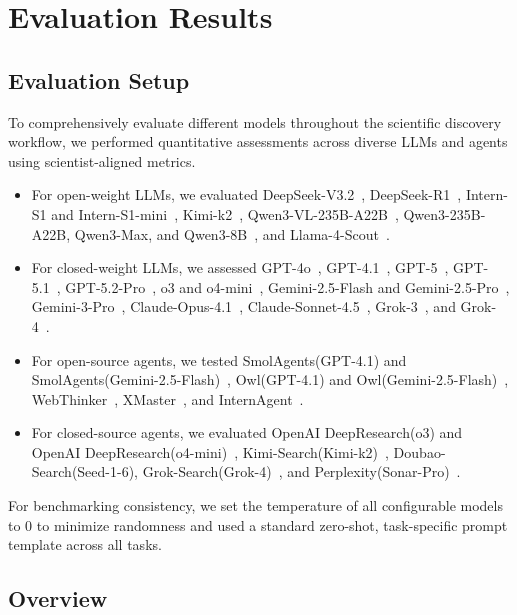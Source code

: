 \section{Evaluation Results}

\subsection{Evaluation Setup}
To comprehensively evaluate different models throughout the scientific discovery workflow, we performed quantitative assessments across diverse LLMs and agents using scientist-aligned metrics.
\begin{itemize}
    \item For open-weight LLMs, we evaluated DeepSeek-V3.2~\cite{DeepSeekV3.2_2025}, DeepSeek-R1~\cite{Guo2025}, Intern-S1 and Intern-S1-mini~\cite{bai2025intern}, Kimi-k2~\cite{team2025kimi}, Qwen3-VL-235B-A22B~\cite{bai2025qwen3}, Qwen3-235B-A22B, Qwen3-Max, and Qwen3-8B~\cite{yang2025qwen3}, and Llama-4-Scout~\cite{Llama4_Release2025}.
    \item For closed-weight LLMs, we assessed GPT-4o~\cite{GPT4o_SystemCard2024}, GPT-4.1~\cite{GPT4.1_Docs2025}, GPT-5~\cite{GPT5_SystemCard2025}, GPT-5.1~\cite{GPT5.1_Addendum2025}, GPT-5.2-Pro~\cite{GPT5.2}, o3 and o4-mini~\cite{OpenAI_o3_2025}, Gemini-2.5-Flash and Gemini-2.5-Pro~\cite{comanici2025gemini}, Gemini-3-Pro~\cite{Gemini3_DeepMind2025}, Claude-Opus-4.1~\cite{ClaudeOpus4.1_2025}, Claude-Sonnet-4.5~\cite{ClaudeSonnet4.5_2025}, Grok-3~\cite{Grok3_2025}, and Grok-4~\cite{Grok4_ModelCard2025}.
    \item For open-source agents, we tested SmolAgents(GPT-4.1) and SmolAgents(Gemini-2.5-Flash)~\cite{SmolAgents_2025}, Owl(GPT-4.1) and Owl(Gemini-2.5-Flash)~\cite{hu2025owl}, WebThinker~\cite{WebThinker_NeurIPS2025}, XMaster~\cite{XMaster_Arxiv2025}, and InternAgent~\cite{team2025novelseek}.
    \item For closed-source agents, we evaluated OpenAI DeepResearch(o3) and OpenAI DeepResearch(o4-mini)~\cite{DeepResearch_OpenAI2025}, Kimi-Search(Kimi-k2)~\cite{KimiResearcher_2025}, Doubao-Search(Seed-1-6), Grok-Search(Grok-4)~\cite{GrokDeepSearch_2025}, and Perplexity(Sonar-Pro)~\cite{Perplexity_DeepResearch_2025}.
\end{itemize}
For benchmarking consistency, we set the temperature of all configurable models to 0 to minimize randomness and used a standard zero-shot, task-specific prompt template across all tasks.


\subsection{Overview}

